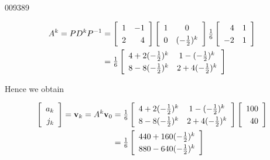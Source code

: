 \begin{example}{}{009389}
\begin{solution}
\begin{align*}
A^k = PD^kP^{-1} &= \leftB \begin{array}{rr}
1 & -1 \\
2 & 4 \end{array}\rightB \leftB \begin{array}{cc}
1 & 0 \\
0 & (-\frac{1}{2})^k \end{array}\rightB
\frac{1}{6}
\leftB \begin{array}{rr}
4 & 1 \\
-2 & 1 \end{array}\rightB \\
&= \frac{1}{6}
\leftB \def\arraystretch{1.25}\begin{array}{cc}
4+2(-\frac{1}{2})^k & 1-(-\frac{1}{2})^k \\
8-8(-\frac{1}{2})^k & 2+4(-\frac{1}{2})^k \end{array}\rightB
\end{align*}

Hence we obtain

\begin{align*}
\leftB \begin{array}{r}
a_k \\
j_k
\end{array}\rightB = \vect{v}_k = A^k \vect{v}_0 & = \frac{1}{6}
\leftB \def\arraystretch{1.25} \begin{array}{cc}
4+2(-\frac{1}{2})^k & 1-(-\frac{1}{2})^k \\
8-8(-\frac{1}{2})^k & 2+4(-\frac{1}{2})^k \end{array}\rightB \leftB \begin{array}{r}
100 \\
40
\end{array}\rightB \\
&= \frac{1}{6} \leftB \def\arraystretch{1.25}\begin{array}{cc}
440 + 160 (-\frac{1}{2})^k \\
880 - 640 (-\frac{1}{2})^k 
\end{array}\rightB
\end{align*}


\end{solution}
\end{example}
